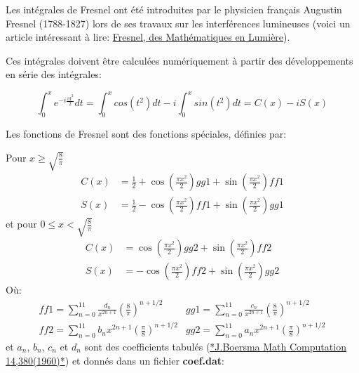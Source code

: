 \documentclass[%
oneside,                 %
final,                   %
10pt,french]{article}
\newenvironment{doconceexercise}{}{}
\newcounter{doconceexercisecounter}
\begin{document}
\begin{doconceexercise}



Les intégrales de Fresnel ont été introduites par le physicien français Augustin Fresnel (1788-1827) lors de ses travaux sur les interférences lumineuses (voici un article intéressant à lire: \href{{http://www.mathouriste.eu/Fresnel/Fresnel.html}}{Fresnel, des Mathématiques en Lumière}).

Ces intégrales doivent être calculées numériquement à partir des développements en série des intégrales:

$$\int_{0}^{x} e^{-i\frac{\pi t^{2}}{2}} dt = \int_{0}^{x} cos(t^2) dt -i \int_{0}^{x} sin(t^2) dt= C(x) -i S(x)$$

Les fonctions de Fresnel sont des fonctions spéciales, définies par:

Pour $x \geq \sqrt{\frac{8}{\pi}}$
\begin{equation*}
\begin{aligned}
C(x) &= \frac{1}{2} + \cos\left(\frac{\pi x^{2}}{2}\right) gg1 + \sin\left(\frac{\pi x^{2}}{2}\right) ff1\\
S(x) &=  \frac{1}{2} - \cos\left(\frac{\pi x^{2}}{2}\right) ff1 + \sin\left(\frac{\pi x^{2}}{2}\right) gg1
\end{aligned}
\end{equation*}
et pour $0 \leq x < \sqrt{\frac{8}{\pi}}$
\begin{equation*}
\begin{aligned}
C(x) &= \cos\left(\frac{\pi x^{2}}{2}\right) gg2 + \sin\left(\frac{\pi x^{2}}{2}\right) ff2 \\
S(x) &= - \cos\left(\frac{\pi x^{2}}{2}\right) ff2 + \sin\left(\frac{\pi x^{2}}{2}\right) gg2
\end{aligned}
\end{equation*}
Où:
\begin{equation*}
\begin{aligned}
ff1 = \sum\limits_{n=0}^{11} \frac{d_{n}}{x^{2n+1}}\left(\frac{8}{\pi}\right)^{n+1/2} & gg1 = \sum\limits_{n=0}^{11} \frac{c_{n}}{x^{2n+1}}\left(\frac{8}{\pi}\right)^{n+1/2}\\
ff2 = \sum\limits_{n=0}^{11} b_{n}x^{2n+1}\left(\frac{\pi}{8}\right)^{n+1/2} & gg2 = \sum\limits_{n=0}^{11} a_{n}x^{2n+1}\left(\frac{\pi}{8}\right)^{n+1/2}
\end{aligned}
\end{equation*}
et $a_n$, $b_n$, $c_n$ et $d_n$ sont des coefficients tabulés  (\href{{https://www.ams.org/journals/mcom/1960-14-072/S0025-5718-1960-0121973-3/S0025-5718-1960-0121973-3.pdf}}{*J.Boersma Math Computation 14,380(1960)*}) et donnés dans un fichier \textbf{coef.dat}:


\end{doconceexercise}
\end{document}
